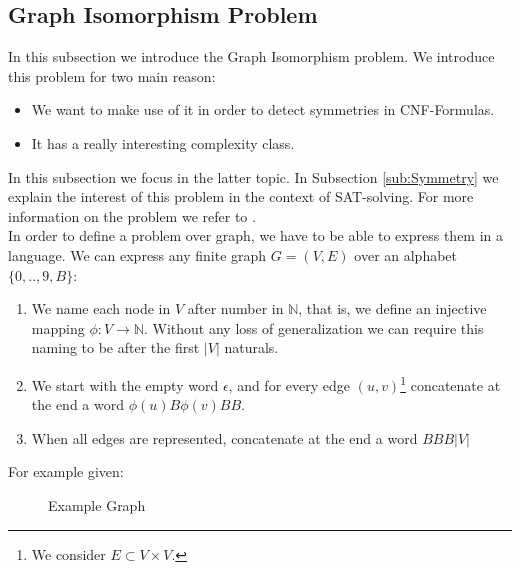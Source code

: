 \subsection{Graph Isomorphism Problem}

In this subsection we introduce the Graph Isomorphism problem. We introduce this problem for two main reason:
\begin{itemize}
\item We want to make use of it in order to detect symmetries in CNF-Formulas.
\item It has a really interesting complexity class.
\end{itemize}

In this subsection we focus in the latter topic. In Subsection \ref{sub:Symmetry} we explain the interest of this problem in the context of SAT-solving. For more information on the problem we refer to \cite{fortin1996graph}. \\

In order to define a problem over graph, we have to be able to express them in a language. We can express any finite graph $G=(V,E)$ over an alphabet $\{0,..,9,B\}$:
\begin{enumerate}
\item We name each node in $V$ after number in $\mathbb{N}$, that is, we define an injective mapping $\phi: V \to \mathbb{N}$. Without any loss of generalization we can require this naming to be after the first $|V|$ naturals.
\item We start with the empty word $\epsilon$, and for every edge $(u,v)$\footnote{We consider $E\subset V\times V$.} concatenate at the end a word $\phi(u)B\phi(v)BB$.
\item When all edges are represented, concatenate at the end a word $BBB|V|$
\end{enumerate}

For example given:

\begin{figure}[H]
  \centering
  
  
  \caption{Example Graph}
\end{figure}


